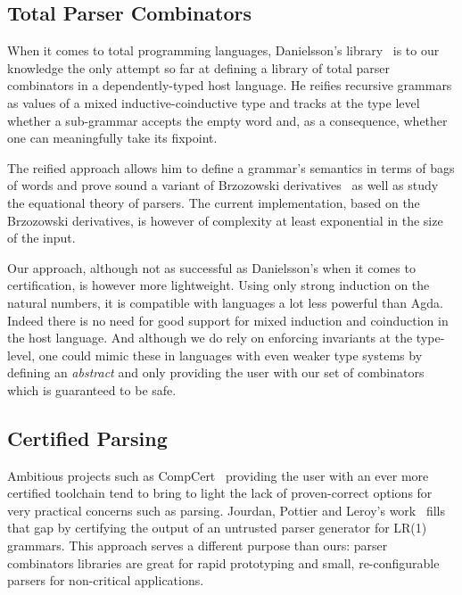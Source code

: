 \subsection{Total Parser Combinators}

When it comes to total programming languages, Danielsson's library~\citeyear{danielsson2010total}
is to our knowledge the only attempt so far at defining a library of total
parser combinators in a dependently-typed host language. He reifies recursive
grammars as values of a mixed inductive-coinductive type and tracks at the
type level whether a sub-grammar accepts the empty word and, as a consequence,
whether one can meaningfully take its fixpoint.

The reified approach allows him to define a grammar's semantics in terms
of bags of words and prove sound a variant of Brzozowski derivatives~\citeyear{brzozowski1964derivatives}
as well as study the equational theory of parsers. The current
implementation, based on the Brzozowski derivatives, is however of complexity
at least exponential in the size of the input.

Our approach, although not as successful as Danielsson's when it comes
to certification, is however more lightweight. Using only strong induction
on the natural numbers, it is compatible with languages a lot less powerful
than Agda. Indeed there is no need for good support for mixed induction and
coinduction in the host language. And although we do rely on enforcing invariants
at the type-level, one could mimic these in languages with even weaker type
systems by defining an \emph{abstract} \BOX{} and only providing the user with
our set of combinators which is guaranteed to be safe.

\subsection{Certified Parsing}

Ambitious projects such as CompCert~\cite{leroy2012compcert} providing
the user with an ever more certified toolchain tend to bring to light
the lack of proven-correct options for very practical concerns such as
parsing. Jourdan, Pottier and Leroy's work~\cite{jourdan2012validating}
fills that gap by certifying the output of an untrusted parser generator
for LR(1) grammars. This approach serves a different purpose than ours:
parser combinators libraries are great for rapid prototyping and small,
re-configurable parsers for non-critical applications.

